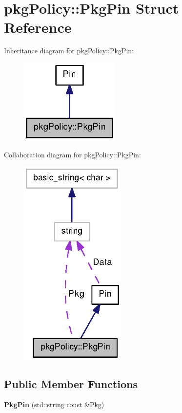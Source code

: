 \section{pkg\-Policy\-:\-:\-Pkg\-Pin \-Struct \-Reference}
\label{structpkgPolicy_1_1PkgPin}


\-Inheritance diagram for pkg\-Policy\-:\-:\-Pkg\-Pin\-:
\nopagebreak
\begin{figure}[H]
\begin{center}
\leavevmode
\includegraphics[width=142pt]{structpkgPolicy_1_1PkgPin__inherit__graph}
\end{center}
\end{figure}


\-Collaboration diagram for pkg\-Policy\-:\-:\-Pkg\-Pin\-:
\nopagebreak
\begin{figure}[H]
\begin{center}
\leavevmode
\includegraphics[width=151pt]{structpkgPolicy_1_1PkgPin__coll__graph}
\end{center}
\end{figure}
\subsection*{\-Public \-Member \-Functions}
\begin{DoxyCompactItemize}
\item 
{\bfseries \-Pkg\-Pin} (std\-::string const \&\-Pkg)\label{structpkgPolicy_1_1PkgPin_afc18d75eac7fd04f064cb2a2a3a2f457}

\end{DoxyCompactItemize}
